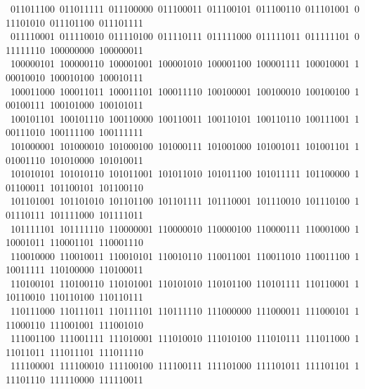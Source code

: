 \begin{flushleft}
\ 011011100\ 011011111\ 011100000\ 011100011\ 011100101\ 011100110\ 011101001\ 011101010\ 011101100\ 011101111\\
\ 011110001\ 011110010\ 011110100\ 011110111\ 011111000\ 011111011\ 011111101\ 011111110\ 100000000\ 100000011\\
\ 100000101\ 100000110\ 100001001\ 100001010\ 100001100\ 100001111\ 100010001\ 100010010\ 100010100\ 100010111\\
\ 100011000\ 100011011\ 100011101\ 100011110\ 100100001\ 100100010\ 100100100\ 100100111\ 100101000\ 100101011\\
\ 100101101\ 100101110\ 100110000\ 100110011\ 100110101\ 100110110\ 100111001\ 100111010\ 100111100\ 100111111\\
\ 101000001\ 101000010\ 101000100\ 101000111\ 101001000\ 101001011\ 101001101\ 101001110\ 101010000\ 101010011\\
\ 101010101\ 101010110\ 101011001\ 101011010\ 101011100\ 101011111\ 101100000\ 101100011\ 101100101\ 101100110\\
\ 101101001\ 101101010\ 101101100\ 101101111\ 101110001\ 101110010\ 101110100\ 101110111\ 101111000\ 101111011\\
\ 101111101\ 101111110\ 110000001\ 110000010\ 110000100\ 110000111\ 110001000\ 110001011\ 110001101\ 110001110\\
\ 110010000\ 110010011\ 110010101\ 110010110\ 110011001\ 110011010\ 110011100\ 110011111\ 110100000\ 110100011\\
\ 110100101\ 110100110\ 110101001\ 110101010\ 110101100\ 110101111\ 110110001\ 110110010\ 110110100\ 110110111\\
\ 110111000\ 110111011\ 110111101\ 110111110\ 111000000\ 111000011\ 111000101\ 111000110\ 111001001\ 111001010\\
\ 111001100\ 111001111\ 111010001\ 111010010\ 111010100\ 111010111\ 111011000\ 111011011\ 111011101\ 111011110\\
\ 111100001\ 111100010\ 111100100\ 111100111\ 111101000\ 111101011\ 111101101\ 111101110\ 111110000\ 111110011\\

\end{flushleft}
